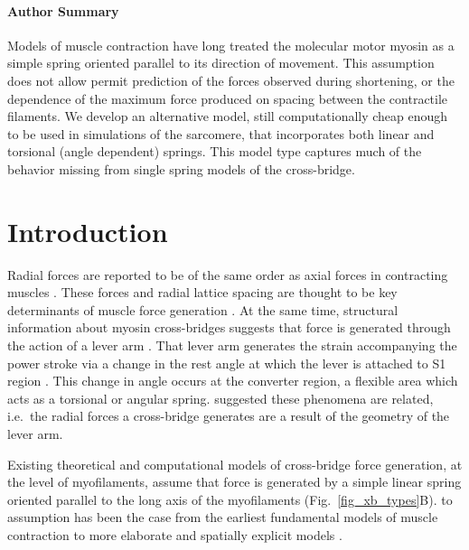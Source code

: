 \documentclass[]{article}
\begin{document}
\paragraph*{Author Summary} %
Models of muscle contraction have long treated the molecular motor myosin as a simple spring oriented parallel to its direction of movement. 
This assumption does not allow permit prediction of the forces observed during shortening, or the dependence of the maximum force produced on spacing between the contractile filaments.
We develop an alternative model, still computationally cheap enough to be used in simulations of the sarcomere, that incorporates both linear and torsional (angle dependent) springs. 
This model type captures much of the behavior missing from single spring models of the cross-bridge.


\section*{Introduction} %

Radial forces are reported to be of the same order as axial forces in contracting muscles \citep{Cecchi1990, Millman1998}. 
These forces and radial lattice spacing are thought to be key determinants of muscle force generation \citep{Fuchs2005}. 
At the same time, structural information about myosin cross-bridges suggests that force is generated through the action of a lever arm \citep{Rayment1993, Uyeda1996, Huxley2000}.
That lever arm generates the strain accompanying the power stroke via a change in the rest angle at which the lever is attached to S1 region \citep{Huxley2000, Houdusse2001}. 
This change in angle occurs at the converter region, a flexible area which acts as a torsional or angular spring. 
\citet{Schoenberg1980b} suggested these phenomena are related, i.e.\ the radial forces a cross-bridge generates are a result of the geometry of the lever arm. 

Existing theoretical and computational models of cross-bridge force generation, at the level of myofilaments, assume that force is generated by a simple linear spring oriented parallel to the long axis of the myofilaments (Fig.~\ref{fig_xb_types}B).  
to assumption has been the case from the earliest fundamental models of muscle contraction to more elaborate and spatially explicit models \citep{Huxley1957, Daniel1998, Chase2004, Tanner2007, Smith2008a, Campbell2009}.  
\end{document}
